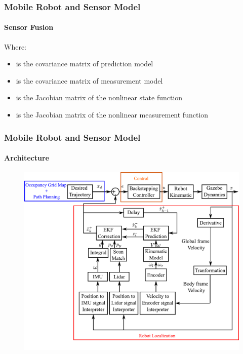 \begin{frame}
	\frametitle{Mobile Robot and Sensor Model}
	\framesubtitle{Sensor Fusion}
	Where:
	\begin{itemize}
		\item { is the covariance matrix of prediction model}
		\item { is the covariance matrix of measurement model}
		\item { is the Jacobian matrix of the nonlinear state function}
		\item { is the Jacobian matrix of the nonlinear measurement function}
	\end{itemize}
\end{frame}



\begin{frame}
	\frametitle{Mobile Robot and Sensor Model}
	\framesubtitle{Architecture}
	\begin{figure}
		\includegraphics[scale=0.45]{image/arch.pdf}
	\end{figure}
\end{frame}



